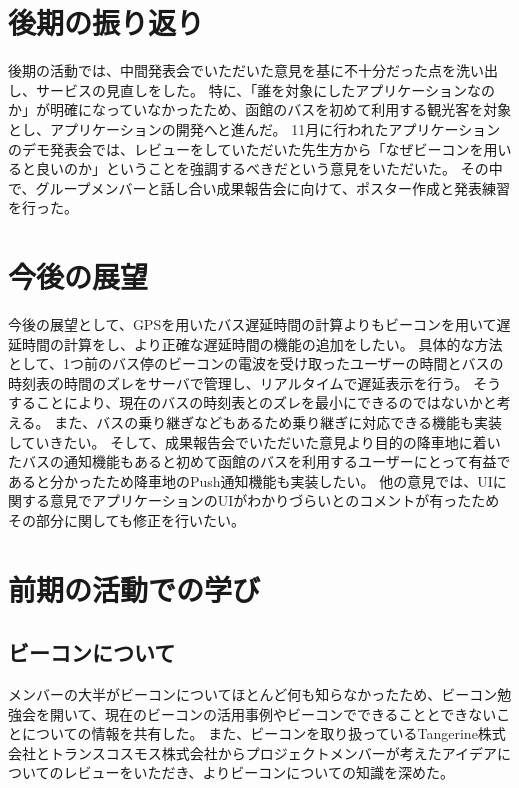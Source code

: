 \documentclass[openany,11pt,papersize]{jsbook}
\begin{document}

\section{後期の振り返り}
後期の活動では、中間発表会でいただいた意見を基に不十分だった点を洗い出し、サービスの見直しをした。
特に、「誰を対象にしたアプリケーションなのか」が明確になっていなかったため、函館のバスを初めて利用する観光客を対象とし、アプリケーションの開発へと進んだ。
11月に行われたアプリケーションのデモ発表会では、レビューをしていただいた先生方から「なぜビーコンを用いると良いのか」ということを強調するべきだという意見をいただいた。
その中で、グループメンバーと話し合い成果報告会に向けて、ポスター作成と発表練習を行った。


\section{今後の展望}
今後の展望として、GPSを用いたバス遅延時間の計算よりもビーコンを用いて遅延時間の計算をし、より正確な遅延時間の機能の追加をしたい。
具体的な方法として、1つ前のバス停のビーコンの電波を受け取ったユーザーの時間とバスの時刻表の時間のズレをサーバで管理し、リアルタイムで遅延表示を行う。
そうすることにより、現在のバスの時刻表とのズレを最小にできるのではないかと考える。
また、バスの乗り継ぎなどもあるため乗り継ぎに対応できる機能も実装していきたい。
そして、成果報告会でいただいた意見より目的の降車地に着いたバスの通知機能もあると初めて函館のバスを利用するユーザーにとって有益であると分かったため降車地のPush通知機能も実装したい。
他の意見では、UIに関する意見でアプリケーションのUIがわかりづらいとのコメントが有ったためその部分に関しても修正を行いたい。



\section{前期の活動での学び}
\subsection{ビーコンについて}
メンバーの大半がビーコンについてほとんど何も知らなかったため、ビーコン勉強会を開いて、現在のビーコンの活用事例やビーコンでできることとできないことについての情報を共有した。
また、ビーコンを取り扱っているTangerine株式会社とトランスコスモス株式会社からプロジェクトメンバーが考えたアイデアについてのレビューをいただき、よりビーコンについての知識を深めた。
\end{document}
